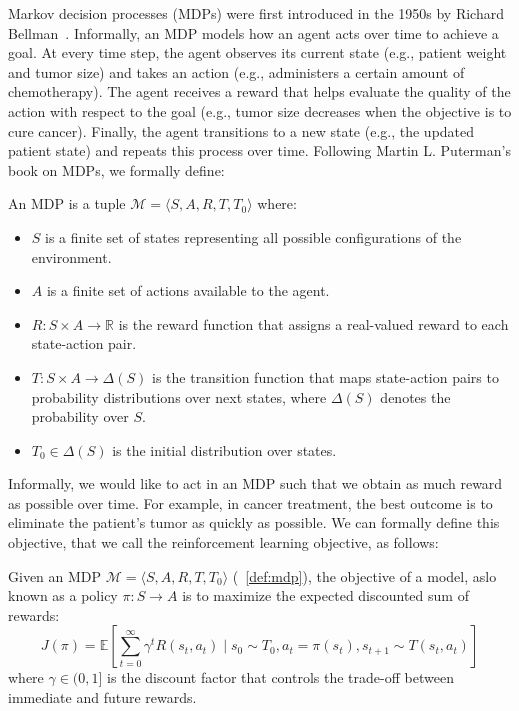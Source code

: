 Markov decision processes (MDPs) were first introduced in the 1950s by Richard Bellman~\cite{Bellman}.
Informally, an MDP models how an agent acts over time to achieve a goal. 
At every time step, the agent observes its current state (e.g., patient weight and tumor size) and takes an action (e.g., administers a certain amount of chemotherapy).
The agent receives a reward that helps evaluate the quality of the action with respect to the goal (e.g., tumor size decreases when the objective is to cure cancer).
Finally, the agent transitions to a new state (e.g., the updated patient state) and repeats this process over time. 
Following Martin L. Puterman's book on MDPs\cite{puterman}, we formally define:
\begin{definition}\label{def:mdp} An MDP is a tuple $\mathcal{M} = \langle S, A, R, T, T_0 \rangle$ where:
\begin{itemize}
\item $S$ is a finite set of states representing all possible configurations of the environment.
\item $A$ is a finite set of actions available to the agent.
\item $R: S \times A \rightarrow \mathbb{R}$ is the reward function that assigns a real-valued reward to each state-action pair.
\item $T: S \times A \rightarrow \Delta(S)$ is the transition function that maps state-action pairs to probability distributions over next states, where $\Delta(S)$ denotes the probability over $S$.
\item $T_0 \in \Delta(S)$ is the initial distribution over states.
\end{itemize}
\end{definition}

Informally, we would like to act in an MDP such that we obtain as much reward as possible over time.
For example, in cancer treatment, the best outcome is to eliminate the patient's tumor as quickly as possible.
We can formally define this objective, that we call the reinforcement learning objective, as follows:

\begin{definition}\label{def:mdp-obj} Given an MDP $\mathcal{M}=\langle S, A, R, T, T_0 \rangle$ (~\ref{def:mdp}), the objective of a model, aslo known as a policy $\pi: S \rightarrow A$ is to maximize the expected discounted sum of rewards:
$$J(\pi) = \mathbb{E}\left[\sum_{t=0}^{\infty} \gamma^t R(s_t, a_t) \mid s_0 \sim T_0, a_t = \pi(s_t), s_{t+1} \sim T(s_t, a_t)\right]$$
where $\gamma \in (0,1]$ is the discount factor that controls the trade-off between immediate and future rewards.
\end{definition}

